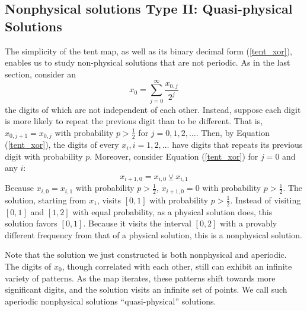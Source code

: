 \subsection{Nonphysical solutions Type II: Quasi-physical Solutions}
\label{sec:quasiphysical}
The simplicity of the tent map, as well as its binary decimal form (\ref{tent_xor}),
enables us to study non-physical solutions that are not periodic.
As in the last section, consider an
\begin{equation}
    x_0 = \sum_{j=0}^{\infty} \frac{x_{0,j}}{2^j}
\end{equation}
the digits of which are not independent of each other.  Instead,
suppose each digit is more likely to repeat the previous digit than to be different.
That is, $x_{0,j+1}=x_{0,j}$ with probability $p>\frac12$ for $j=0,1,2,\ldots$.
Then, by Equation (\ref{tent_xor}), the digits of every $x_i, i=1,2,\ldots$
have digits that repeats its previous digit with probability $p$.
Moreover, consider Equation (\ref{tent_xor}) for $j=0$ and any $i$:
\begin{equation}
    x_{i+1,0} = x_{i,0} \veebar x_{i,1}
\end{equation}
Because $x_{i,0}=x_{i,1}$ with probability $p>\frac12$, $x_{i+1,0}=0$ with probability 
$p>\frac12$.  The solution, starting from $x_1$, visits $[0,1]$ with
probability $p>\frac12$.  Instead of visiting $[0,1]$ and $[1,2]$ with
equal probability, as a physical solution does, this solution favors $[0,1]$.
Because it visits the interval $[0,2]$ with a provably different frequency from that
of a physical solution, this is a nonphysical solution.

Note that the solution we just constructed is both nonphysical and aperiodic.
The digits of $x_0$, though correlated with each other,
still can exhibit an infinite variety of patterns.  As the map iterates, these patterns
shift towards more significant digits, and the solution visits an infinite set of
points.  We call such aperiodic nonphysical solutions ``quasi-physical'' solutions.

